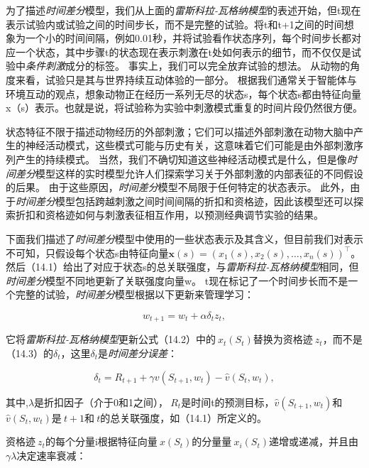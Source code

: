 为了描述\textit{时间差分}模型，我们从上面的\textit{雷斯科拉-瓦格纳模型}的表述开始，但t现在表示试验内或试验之间的时间步长，而不是完整的试验。将t和t+1之间的时间想象为一个小的时间间隔，例如0.01秒，并将试验看作状态序列，每个时间步长都对应一个状态，其中步骤t的状态现在表示刺激在t处如何表示的细节，而不仅仅是试验中\textit{条件刺激}成分的标签。
事实上，我们可以完全放弃试验的想法。
从动物的角度来看，试验只是其与世界持续互动体验的一部分。
根据我们通常关于智能体与环境互动的观点，想象动物正在经历一系列无尽的状态s，每个状态s都由特征向量x（s）表示。也就是说，将试验称为实验中刺激模式重复的时间片段仍然很方便。


状态特征不限于描述动物经历的外部刺激；它们可以描述外部刺激在动物大脑中产生的神经活动模式，这些模式可能与历史有关，这意味着它们可能是由外部刺激序列产生的持续模式。
当然，我们不确切知道这些神经活动模式是什么，但是像\textit{时间差分}模型这样的实时模型允许人们探索学习关于外部刺激的内部表征的不同假设的后果。
由于这些原因，\textit{时间差分}模型不局限于任何特定的状态表示。
此外，由于\textit{时间差分}模型包括跨越刺激之间时间间隔的折扣和资格迹，因此该模型还可以探索折扣和资格迹如何与刺激表征相互作用，以预测经典调节实验的结果。


下面我们描述了\textit{时间差分}模型中使用的一些状态表示及其含义，但目前我们对表示不可知，只假设每个状态s由特征向量$\mathbf{x}(s)=\left(x_{1}(s), x_{2}(s), \ldots, x_{n}(s)\right)^{\top}$。
然后（14.1）给出了对应于状态s的总关联强度，与\textit{雷斯科拉-瓦格纳模型}相同，但\textit{时间差分}模型不同地更新了关联强度向量w。
t现在标记了一个时间步长而不是一个完整的试验，\textit{时间差分}模型根据以下更新来管理学习：

\begin{equation}\label{key}
	w_{t+1} = w_t + \alpha \delta_t z_t,
\end{equation}

它将\textit{雷斯科拉-瓦格纳模型}更新公式（14.2）中的$\ x_t(S_t)$替换为资格迹$\ z_t$，而不是（14.3）的$\delta_t$，这里$\delta_t$是\textit{时间差分误差}：


\begin{equation}\label{eq:td_error}
	\delta_t = 
	R_{t+1} + \gamma v (S_{t+1}, w_t) - \hat v(S_t, w_t),
\end{equation}


其中,$\lambda$是折扣因子（介于0和1之间），$\ R_t$是时间t的预测目标，$\hat{v}(S_{t+1}, w_t)$和$\hat{v}(S_t, w_t)$是$\ t+1$和$\ t$的总关联强度，如（14.1）所定义的。


资格迹$\ z_t$的每个分量i根据特征向量$\ x(S_t)$的分量量$\ x_i(S_t)$递增或递减，并且由$\gamma \lambda$决定速率衰减：

